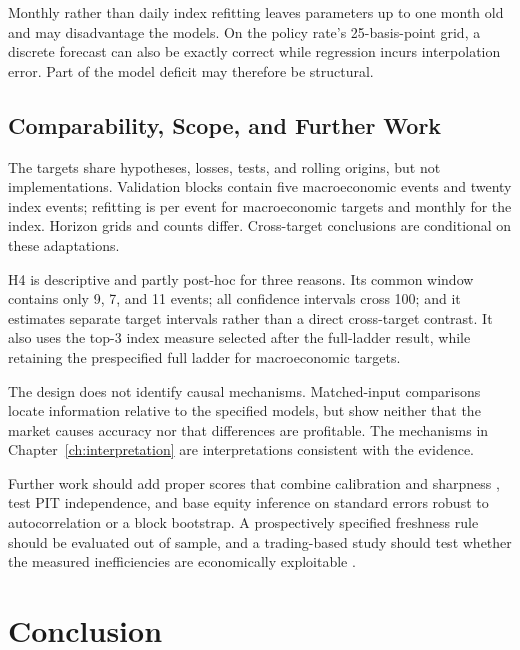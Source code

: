 \documentclass[12pt,a4paper]{report}
\begin{document}
Monthly rather than daily index refitting leaves parameters up to one month old
and may disadvantage the models. On the policy rate's 25-basis-point grid, a
discrete forecast can also be exactly correct while regression incurs
interpolation error. Part of the model deficit may therefore be structural.

\section{Comparability, Scope, and Further Work}
\label{sec:limitations-reach}

The targets share hypotheses, losses, tests, and rolling origins, but not
implementations. Validation blocks contain five macroeconomic events and
twenty index events; refitting is per event for macroeconomic targets and
monthly for the index. Horizon grids and counts differ. Cross-target conclusions are
conditional on these adaptations.

H4 is descriptive and partly post-hoc for three reasons. Its common window
contains only 9, 7, and 11 events; all confidence intervals cross 100; and it
estimates separate target intervals rather than a direct cross-target
contrast. It also uses the top-3 index measure selected after the full-ladder
result, while retaining the prespecified full ladder for macroeconomic
targets.

The design does not identify causal mechanisms. Matched-input comparisons
locate information relative to the specified models, but show neither that the
market causes accuracy nor that differences are profitable. The mechanisms in
Chapter~\ref{ch:interpretation} are interpretations consistent with the
evidence.

Further work should add proper scores that combine calibration and sharpness
\parencite{gneiting2007}, test PIT independence, and base equity inference on
standard errors robust to autocorrelation or a block bootstrap. A
prospectively specified freshness rule should be evaluated out of sample, and
a trading-based study should test whether the measured inefficiencies are
economically exploitable \parencite{fama1970}.

\chapter{Conclusion}
\label{ch:conclusion}
\end{document}
